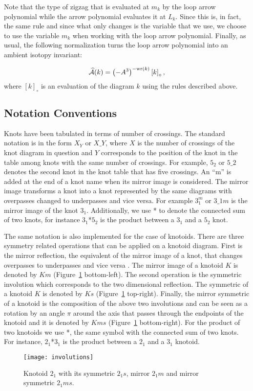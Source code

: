 Note that the type of zigzag that is evaluated at $m_k$ by the loop arrow polynomial while the arrow polynomial evaluates it at $L_k$. Since this is, in fact, the same rule and since what only changes is the variable that we use, we choose to use the variable $m_k$ when working with the loop arrow polynomial. Finally, as usual, the following normalization turns the loop arrow polynomial into an ambient isotopy invariant:

\begin{equation}\label{eq:arrow}
\widehat{\mathcal{A}}(k) = \left( - A^3 \right )^{-{\rm wr}(k)} \left [ k \right ]_{\circ},
\end{equation}
where $ \left [ k  \right ]_{\circ}$ is an evaluation of the diagram $k$ using the rules described above.



\subsection{\label{sec:theory:notations}Notation Conventions}
Knots have been tabulated in terms of number of crossings\cite{Rolfsen1976,Adams,dowker1983,hoste1998}. The standard notation is in the form $X_Y$ or $X\_ Y$, where $X$ is the number of crossings of the knot diagram in question and $Y$ corresponds to the position of the knot in the table among knots with the same number of crossings. For example, $5_2$ or $5\_2$ denotes the second knot in the knot table that has five crossings. An ``m'' is added at the end of a knot name when its mirror image is considered. The mirror image transforms a knot into a knot represented by the same diagrams with overpasses changed to underpasses and vice versa\cite{Adams}. For example $3_1^m$ or $3\_1m$ is the mirror image of the knot $3_1$. Additionally, we use * to denote the connected sum of two knots, for instance $3_1$*$5_2$ is the product between a $3_1$ and a $5_2$ knot.

The same notation is also implemented for the case of knotoids. There are three symmetry related operations that can be applied on a knotoid diagram. First is the mirror reflection, the equivalent of the mirror image of a knot, that changes overpasses to underpasses and vice versa \cite{turaev}. The mirror image of a knotoid $K$ is denoted by $Km$ (Figure~\ref{fig:involutions} bottom-left). The second operation is the symmetric involution which corresponds to the two dimensional reflection. The symmetric of a knotoid $K$ is denoted by $Ks$ (Figure~\ref{fig:involutions} top-right). Finally, the mirror symmetric of a knotoid is the composition of the above two involutions and can be seen as a rotation by an angle $\pi$ around the axis that passes through the endpoints of the knotoid and it is denoted by $Kms$ (Figure~\ref{fig:involutions} bottom-right). For the product of two knotoids we use *, the same symbol with the connected sum of two knots. For instance, $2_1$*$3_1$ is the product between a $2_1$ and a $3_1$ knotoid.
\begin{figure}[h]
\centering
\texttt{[image: involutions]}
\caption{Knotoid $2_1$ with its symmetric $2_1s$, mirror $2_1m$ and mirror symmetric $2_1ms$.}\label{fig:involutions}
\end{figure}



